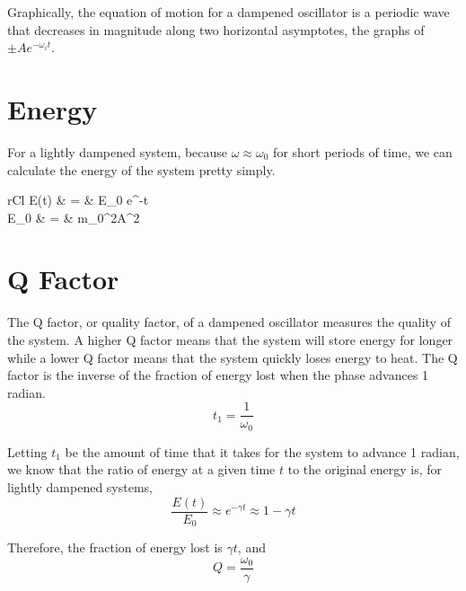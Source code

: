 \documentclass[11pt]{article}
\begin{document}
	Graphically, the equation of motion for a dampened oscillator is a periodic wave that decreases in magnitude along two horizontal asymptotes, the graphs of $\pm Ae^{-\omega_i t}$.
	
\section{Energy}
	For a lightly dampened system, because $\omega \approx \omega_0$ for short periods of time, we can calculate the energy of the system pretty simply.
	\begin{IEEEeqnarray}{rCl}
		E(t) & = & E_0 e^{-\gamma t}\\
		E_0 & = & m\omega_0^2A^2
	\end{IEEEeqnarray}
	
\section{Q Factor}
	The Q factor, or quality factor, of a dampened oscillator measures the quality of the system. A higher Q factor means that the system will store energy for longer while a lower Q factor means that the system quickly loses energy to heat. The Q factor is the inverse of the fraction of energy lost when the phase advances 1 radian.
	\begin{equation}
		t_1 = \frac{1}{\omega_0}
	\end{equation}
	
	Letting $t_1$ be the amount of time that it takes for the system to advance 1 radian, we know that the ratio of energy at a given time $t$ to the original energy is, for lightly dampened systems,
	\begin{equation}
		\frac{E(t)}{E_0} \approx e^{-\gamma t} \approx 1 - \gamma t
	\end{equation}
	
	Therefore, the fraction of energy lost is $\gamma t$, and 
	\begin{equation}
		Q = \frac{\omega_0}{\gamma}
	\end{equation}
%		
%		


\end{document}
